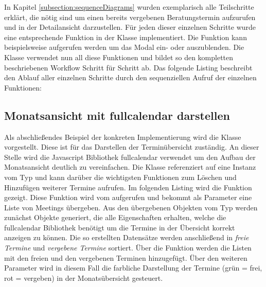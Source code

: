 In Kapitel \ref{subsection:sequenceDiagrams} wurden exemplarisch alle
Teilschritte erklärt, die nötig sind um einen bereits vergebenen
Beratungstermin aufzurufen und in der Detailansicht darzustellen. Für jeden
dieser einzelnen Schritte wurde eine entsprechende Funktion in der Klasse
 implementiert. Die Funktion
 kann beispielsweise aufgerufen werden um das
Modal ein- oder auszublenden. Die Klasse  verwendet
nun all diese Funktionen und bildet so den kompletten beschriebenen Workflow
Schritt für Schritt ab. Das folgende Listing beschreibt den Ablauf aller
einzelnen Schritte durch den sequenziellen Aufruf der einzelnen Funktionen:






\subsection*{Monatsansicht mit fullcalendar darstellen}

Als abschließendes Beispiel der konkreten Implementierung wird die Klasse
 vorgestellt. Diese ist für das Darstellen der
Terminübersicht zuständig. An dieser Stelle wird die Javascript Bibliothek
\gls{fullcalendar} verwendet um den Aufbau der Monatsansicht deutlich zu vereinfachen. Die Klasse 
referenziert auf eine Instanz vom Typ  und kann darüber die
wichtigsten Funktionen zum Löschen und Hinzufügen weiterer Termine aufrufen. Im
folgenden Listing wird die Funktion  gezeigt.
Diese Funktion wird vom  aufgerufen und bekommt als
Parameter eine Liste von Meetings übergeben. Aus den übergebenen Objekten vom
Typ  werden zunächst Objekte generiert, die alle Eigenschaften
erhalten, welche die fullcalendar Bibliothek benötigt um die Termine
in der Übersicht korrekt anzeigen zu können. Die so erstellten Datensätze
werden anschließend in \textit{freie Termine} und \textit{vergebene Termine}
sortiert. Über die Funktion 
werden die Listen mit den freien und den vergebenen Terminen hinzugefügt. Über
den weiteren Parameter  wird in diesem Fall die farbliche
Darstellung der Termine (grün = frei, rot = vergeben) in der Monatsübersicht gesteuert.

